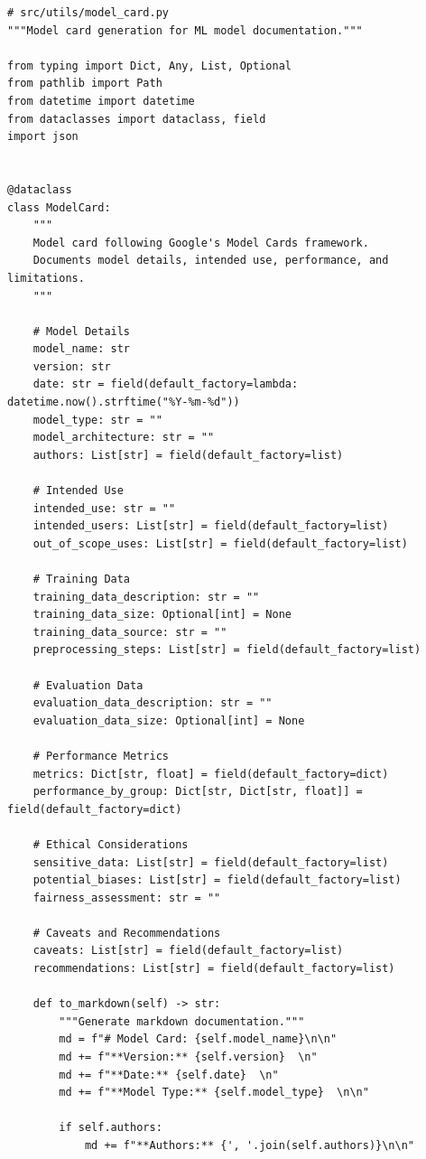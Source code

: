 \begin{lstlisting}[style=python, caption=Automated model card generation]
# src/utils/model_card.py
"""Model card generation for ML model documentation."""

from typing import Dict, Any, List, Optional
from pathlib import Path
from datetime import datetime
from dataclasses import dataclass, field
import json


@dataclass
class ModelCard:
    """
    Model card following Google's Model Cards framework.
    Documents model details, intended use, performance, and limitations.
    """

    # Model Details
    model_name: str
    version: str
    date: str = field(default_factory=lambda: datetime.now().strftime("%Y-%m-%d"))
    model_type: str = ""
    model_architecture: str = ""
    authors: List[str] = field(default_factory=list)

    # Intended Use
    intended_use: str = ""
    intended_users: List[str] = field(default_factory=list)
    out_of_scope_uses: List[str] = field(default_factory=list)

    # Training Data
    training_data_description: str = ""
    training_data_size: Optional[int] = None
    training_data_source: str = ""
    preprocessing_steps: List[str] = field(default_factory=list)

    # Evaluation Data
    evaluation_data_description: str = ""
    evaluation_data_size: Optional[int] = None

    # Performance Metrics
    metrics: Dict[str, float] = field(default_factory=dict)
    performance_by_group: Dict[str, Dict[str, float]] = field(default_factory=dict)

    # Ethical Considerations
    sensitive_data: List[str] = field(default_factory=list)
    potential_biases: List[str] = field(default_factory=list)
    fairness_assessment: str = ""

    # Caveats and Recommendations
    caveats: List[str] = field(default_factory=list)
    recommendations: List[str] = field(default_factory=list)

    def to_markdown(self) -> str:
        """Generate markdown documentation."""
        md = f"# Model Card: {self.model_name}\n\n"
        md += f"**Version:** {self.version}  \n"
        md += f"**Date:** {self.date}  \n"
        md += f"**Model Type:** {self.model_type}  \n\n"

        if self.authors:
            md += f"**Authors:** {', '.join(self.authors)}\n\n"


\end{lstlisting}
